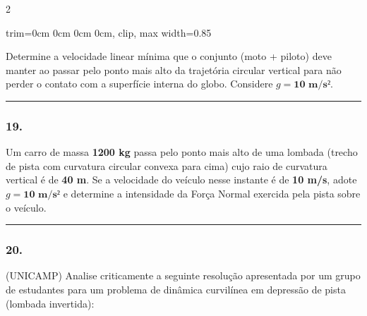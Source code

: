 \documentclass[twoside, 10pt, a4paper]{article}
\newlength{\espacoPreQuestao}\setlength{\espacoPreQuestao}{0.1cm}
\newlength{\espacoQuestao}\setlength{\espacoQuestao}{0.2cm}
\newcommand{\larguraTikz}{0.85\linewidth}
\begin{document}
\begin{multicols*}{2}
\begin{center}
\begin{adjustbox}{trim=0cm 0cm 0cm 0cm, clip, max width=\larguraTikz}
\end{adjustbox}
\end{center}

Determine a velocidade linear mínima que o conjunto (moto + piloto) deve manter ao passar pelo ponto mais alto da trajetória circular vertical para não perder o contato com a superfície interna do globo. Considere $g = \textbf{10 m/s²}$.
\par\vspace{\espacoQuestao}

\noindent\textcolor{CorLinha}{\rule{\linewidth}{0.5pt}} 
\par\vspace{\espacoPreQuestao}
\subsubsection*{19.} Um carro de massa \textbf{1200 kg} passa pelo ponto mais alto de uma lombada (trecho de pista com curvatura circular convexa para cima) cujo raio de curvatura vertical é de \textbf{40 m}. Se a velocidade do veículo nesse instante é de \textbf{10 m/s}, adote $g = \textbf{10 m/s²}$ e determine a intensidade da Força Normal exercida pela pista sobre o veículo.
\par\vspace{\espacoQuestao}

\noindent\textcolor{CorLinha}{\rule{\linewidth}{0.5pt}} 
\par\vspace{\espacoPreQuestao}
\subsubsection*{20.} (UNICAMP) Analise criticamente a seguinte resolução apresentada por um grupo de estudantes para um problema de dinâmica curvilínea em depressão de pista (lombada invertida):


\end{multicols*}
\end{document}
